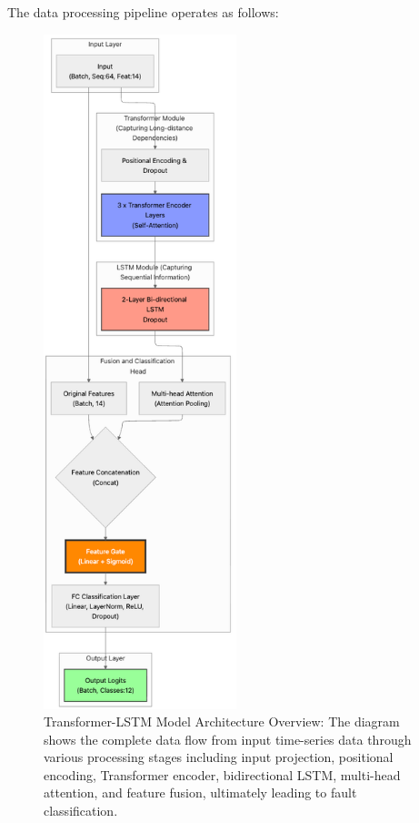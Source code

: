 The data processing pipeline operates as follows:
\begin{figure}[p]
\centering
\includegraphics[width=0.5\textwidth]{logos/transformer-lstm.png}
\caption{Transformer-LSTM Model Architecture Overview: The diagram shows the complete data flow from input time-series data through various processing stages including input projection, positional encoding, Transformer encoder, bidirectional LSTM, multi-head attention, and feature fusion, ultimately leading to fault classification.}
\label{fig:hybrid_architecture}
\end{figure}

